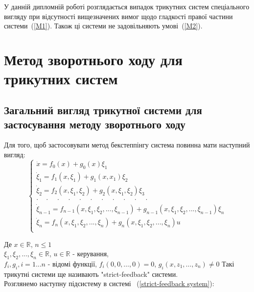\documentclass{article}
\begin{document}
У данній дипломній роботі розглядається випадок трикутних систем спеціального вигляду при відсутності вищезначених вимог
щодо гладкості правої  частини системи~(\ref{M1}). Також ці системи не задовільняють умові~(\ref{M2}).
\pagebreak




\section{Метод зворотнього ходу для трикутних систем}
\subsection{Загальний вигляд трикутної системи для застосування методу зворотнього ходу}
Для того, щоб застосовувати метод бекстеппінгу система повинна мати наступний вигляд:
\begin{equation} \label{strict-feedback system}
    \begin{cases}
        \dot x           = f_0(x)+g_0(x)\xi_1\\
        \dot \xi_1       = f_1(x, \xi_1)+g_{1}(x, x_1)\xi_2 \\
        \dot \xi_2       = f_2(x, \xi_1, \xi_2) + g_2(x, \xi_1, \xi_2)\xi_3 \\
       \cdot \quad \cdot \quad \cdot \quad \cdot  \quad \cdot  \quad \cdot
        \quad \cdot  \quad \cdot  \quad \cdot  \quad \cdot  \quad \cdot\\

       \dot \xi_{n-1}   = f_{n-1}(x, \xi_1, \xi_2, ... ,\xi_{n-1}) 
        +g_{n-1}(x, \xi_1, \xi_2, ... ,\xi_{n-1}) \xi_n\\
        \dot \xi_{n}     = f_{n}(x, \xi_1, \xi_2, ... ,\xi_{n}) 
        +g_{n}(x, \xi_1, \xi_2, ... ,\xi_{n})u\\

	\end{cases}
\end{equation}


Де $x \in \mathbb{R}$, $n \leq 1$\\
$\xi_1, \xi_2, ... ,\xi_n \in \mathbb{R}$, $u \in \mathbb{R}$ - керування,\\ 
$f_i, g_i, i = 1 ... n $ -  відомі функції, $f_i(0,0, \dots, 0) = 0$, 
$g_i(x,z_1, \dots, z_n) \neq 0$
Такі трикутні системи ще називають "strict-feedback" системи.\\
Розглянемо наступну підсистему в системі ~(\ref{strict-feedback system}):
\end{document}
